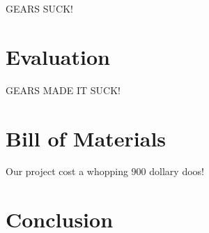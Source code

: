 \documentclass[11pt]{ieeeconf}
\begin{document}
GEARS SUCK!

\section{Evaluation}

GEARS MADE IT SUCK!

\section{Bill of Materials}

Our project cost a whopping 900 dollary doos!

\section{Conclusion}



\end{document}
